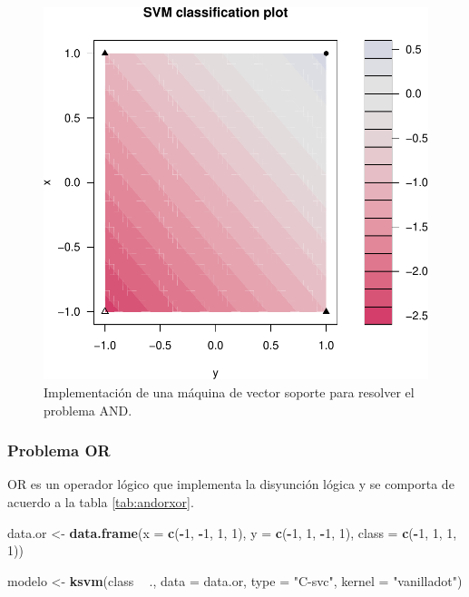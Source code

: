 \documentclass[12pt,spanish,a4paper]{article}
\newenvironment{Shaded}{\begin{snugshade}}{\end{snugshade}}
\newcommand{\KeywordTok}[1]{\textcolor[rgb]{0.13,0.29,0.53}{\textbf{#1}}}
\newcommand{\DataTypeTok}[1]{\textcolor[rgb]{0.13,0.29,0.53}{#1}}
\newcommand{\DecValTok}[1]{\textcolor[rgb]{0.00,0.00,0.81}{#1}}
\newcommand{\StringTok}[1]{\textcolor[rgb]{0.31,0.60,0.02}{#1}}
\newcommand{\OperatorTok}[1]{\textcolor[rgb]{0.81,0.36,0.00}{\textbf{#1}}}
\newcommand{\NormalTok}[1]{#1}
\numberwithin{equation}{section}
\begin{document}
\begin{figure}[h]

{\centering \includegraphics[width=0.65\linewidth]{graphics/svm/and-1} 

}

\caption{Implementación de una máquina de vector soporte para resolver el problema AND.}\label{fig:and}
\end{figure}

\subsubsection{Problema OR}\label{problema-or}

OR es un operador lógico que implementa la disyunción lógica y se
comporta de acuerdo a la tabla \ref{tab:andorxor}.

\begin{Shaded}
\begin{Highlighting}[]
\NormalTok{data.or <-}\StringTok{ }\KeywordTok{data.frame}\NormalTok{(}\DataTypeTok{x =} \KeywordTok{c}\NormalTok{(}\OperatorTok{-}\DecValTok{1}\NormalTok{, }\OperatorTok{-}\DecValTok{1}\NormalTok{, }\DecValTok{1}\NormalTok{, }\DecValTok{1}\NormalTok{), }
                       \DataTypeTok{y =} \KeywordTok{c}\NormalTok{(}\OperatorTok{-}\DecValTok{1}\NormalTok{, }\DecValTok{1}\NormalTok{, }\OperatorTok{-}\DecValTok{1}\NormalTok{, }\DecValTok{1}\NormalTok{),}
                       \DataTypeTok{class =} \KeywordTok{c}\NormalTok{(}\OperatorTok{-}\DecValTok{1}\NormalTok{, }\DecValTok{1}\NormalTok{, }\DecValTok{1}\NormalTok{, }\DecValTok{1}\NormalTok{))}

\NormalTok{modelo <-}\StringTok{ }\KeywordTok{ksvm}\NormalTok{(class }\OperatorTok{~}\StringTok{ }\NormalTok{., }
               \DataTypeTok{data =}\NormalTok{ data.or, }
               \DataTypeTok{type =} \StringTok{"C-svc"}\NormalTok{, }
               \DataTypeTok{kernel =} \StringTok{"vanilladot"}\NormalTok{)}
\end{Highlighting}
\end{Shaded}
\end{document}
